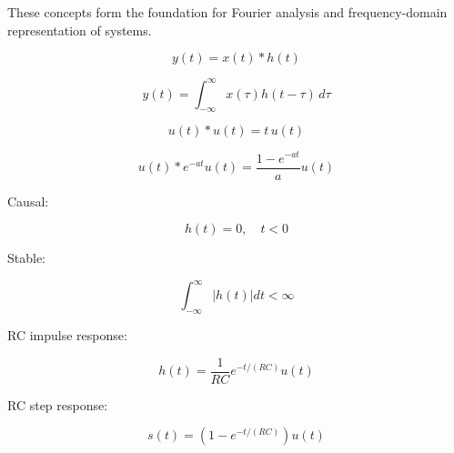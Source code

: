 These concepts form the foundation for Fourier analysis and frequency-domain
representation of systems.


\begin{tcolorbox}[title=One-Minute Revision,colback=blue!5]

\[
y(t)=x(t)*h(t)
\]

\[
y(t)=\int_{-\infty}^{\infty}x(\tau)h(t-\tau)\,d\tau
\]

\[
u(t)*u(t)=t\,u(t)
\]

\[
u(t)*e^{-at}u(t)=\frac{1-e^{-at}}{a}u(t)
\]

Causal:

\[
h(t)=0,\quad t<0
\]

Stable:

\[
\int_{-\infty}^{\infty}|h(t)|dt<\infty
\]

RC impulse response:

\[
h(t)=\frac{1}{RC}e^{-t/(RC)}u(t)
\]

RC step response:

\[
s(t)=\left(1-e^{-t/(RC)}\right)u(t)
\]

\end{tcolorbox}
